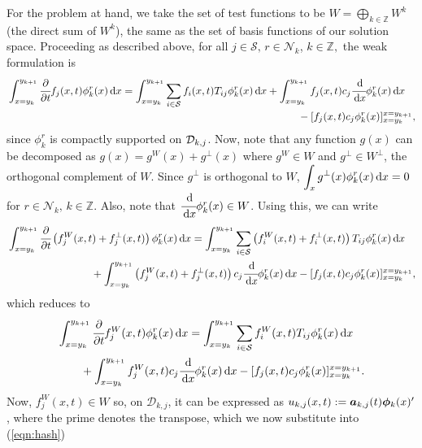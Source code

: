 For the problem at hand, we take the set of test functions to be \(W = \bigoplus\limits_{k\in\mathbb Z} W^k\) (the direct sum of \(W^k\)), the same as the set of basis functions of our solution space. Proceeding as described above, for all \(j\in\mathcal S,\,r\in\mathcal N_k\), \(k\in\mathbb Z,\) the weak formulation is 
\begin{align*}
	\begin{multlined}[t]\int_{x=y_k}^{y_{k+1}}\cfrac{\partial}{\partial t} f_j(x,t)\phi^r_k(x)\wrt x = \int_{x=y_k}^{y_{k+1}}\sum_{i\in\calS}  f_i(x,t)T_{ij}\phi^r_k(x)\wrt x  
	+  \int_{x=y_k}^{y_{k+1}} f_j(x,t)c_j\cfrac{\wrt}{\wrt x}\phi^r_k(x)\wrt x \\ {}- [f_j(x,t)c_j\phi^r_k(x)]_{x=y_k}^{x=y_{k+1}}, \end{multlined}
\end{align*}
since \(\phi^r_k\) is compactly supported on \(\mathcal{D}_{k,j}\). Now, note that any function \(g(x)\) can be decomposed as \(g(x) = g^{W}(x)+g^\perp(x)\) where \(g^{W}\in W\) and \(g^\perp \in W^\perp\), the orthogonal complement of \(W\). Since \(g^\perp\) is orthogonal to \(W\), \(\displaystyle\int_{x}g^\perp(x)\phi^r_k(x)\, \mathrm{d} x=0\) for \(r\in\mathcal N_k,\,k\in\mathbb Z\). Also, note that \(\cfrac{\, \mathrm{d}}{\, \mathrm{d} x}\phi^r_k(x)\in W\). Using this, we can write 
\begin{align*}
	\begin{multlined}[t]\int_{x=y_{k}}^{y_{k+1}}\cfrac{\partial}{\partial t} \left(f_j^W(x,t)+f_j^\perp(x,t)\right)\phi^r_k(x)\wrt x 
	= \int_{x=y_k}^{y_{k+1}}\sum_{i\in\calS} \left(f_i^W(x,t)+f_i^\perp(x,t)\right)T_{ij}\phi^r_k(x)\wrt x  
	\\ {}
	+  \int_{x=y_k}^{y_{k+1}} \left(f_j^W(x,t)+f_j^\perp(x,t)\right)c_j\cfrac{\wrt}{\wrt x}\phi^r_k(x)\wrt x - [f_j(x,t)c_j\phi^r_k(x)]_{x=y_k}^{x=y_{k+1}}, \end{multlined}
\end{align*}
	which reduces to
\begin{align}
	\begin{multlined}[t]\int_{x=y_k}^{y_{k+1}}\cfrac{\partial}{\partial t} f_j^W(x,t)\phi^r_k(x)\wrt x = \int_{x=y_k}^{y_{k+1}}\sum_{i\in\calS} f_i^W(x,t)T_{ij}\phi^r_k(x)\wrt x  
	\\{} + \int_{x=y_k}^{y_{k+1}} f_j^W(x,t)c_j\cfrac{\wrt}{\wrt x}\phi^r_k(x)\wrt x - [f_j(x,t)c_j\phi^r_k(x)]_{x=y_k}^{x=y_{k+1}}. \end{multlined} \label{eqn:hash}
\end{align}
Now, \(f_j^W(x,t)\in W\) so, on \(\mathcal D_{k,j}\), it can be expressed as \(u_{k,j}(x,t):=\boldsymbol a_{k,j}(t) \boldsymbol \phi_k(x)'{}\), where the prime denotes the transpose, which we now substitute into (\ref{eqn:hash})
